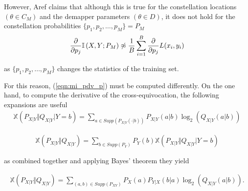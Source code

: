 However, Aref claims that although this is true for the constellation locations $(\theta \in C_M)$ and the demapper parameters $(\theta \in D)$, it does not hold for the constellation probabilities $\{p_1, p_2, \dots, p_M\} = P_M$
\begin{align}
\label{eqn:mi_pdv_p}
	\pdv{p_j} \mathbb{I} \left(X , Y ; P_M \right) \not\approx \dfrac{1}{B} \sum \limits_{i = 1}^{B} \pdv{p_j} L(x_i, y_i)
\end{align}

as $\{p_1, p_2, \dots, p_M\}$ changes the statistics of the training set.

For this reason, (\ref{eqn:mi_pdv_p}) must be computed differently. On the one hand, to compute the derivative of the cross-equivocation, the following expansions are useful
\begin{align}
	\mathbb{X}\left(P_{X|Y} \Vert Q_{X|Y} \vert Y=b \right) = \sum \limits_{a \in Supp(P_{X|Y}(\cdot|b))} P_{X|Y}(a|b) \log_2(Q_{X|Y}(a|b))
\end{align}

\begin{align}
	\mathbb{X}\left(P_{X|Y} \Vert Q_{X|Y}\right) = \sum \limits_{b \in Supp(P_Y)} P_Y(b) \mathbb{X}\left( P_{X|Y} \Vert Q_{X|Y} \vert Y=b \right) 
\end{align}

as combined together and applying Bayes' theorem they yield

\begin{align}
\label{eqn:CE_expanded}
	\mathbb{X}\left(P_{X|Y} \Vert Q_{X|Y}\right) = \sum \limits_{(a,b) \in Supp(P_{XY})} P_X(a) P_{Y|X}(b|a) \log_2(Q_{X|Y}(a|b)). 
\end{align}

